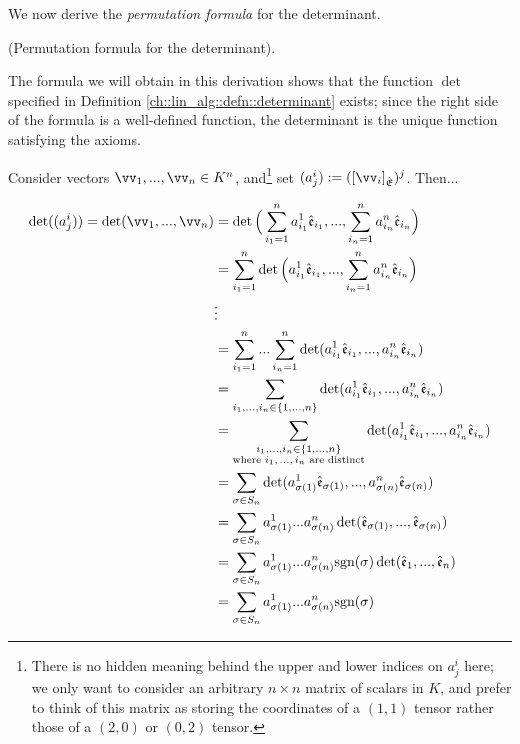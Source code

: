 We now derive the \textit{permutation formula} for the determinant.

\begin{deriv}
\label{ch::lin_alg::deriv::permutation_formula_for_determinant}
    (Permutation formula for the determinant).
    
    The formula we will obtain in this derivation shows that the function $\det$ specified in Definition \ref{ch::lin_alg::defn::determinant} exists; since the right side of the formula is a well-defined function, the determinant is the unique function satisfying the axioms.
    
    Consider vectors $\vv_1, ..., \vv_n \in K^n$, and\footnote{There is no hidden meaning behind the upper and lower indices on $a^i_j$ here; we only want to consider an arbitrary $n \times n$ matrix of scalars in $K$, and prefer to think of this matrix as storing the coordinates of a $(1, 1)$ tensor rather those of a $(2, 0)$ or $(0, 2)$ tensor.} set $(a^i_j) := ([\vv_i]_\sE)^j$. Then...
    
    \begin{align*}
        \det((a^i_j)) = \det(\vv_1, ..., \vv_n)
        &= \det \Big(\sum_{i_1 = 1}^n a^1_{i_1} \see_{i_1}, ..., \sum_{i_n = 1}^n a^n_{i_n} \see_{i_n} \Big) \\
        &= \sum_{i_1 = 1}^n \det \Big( a^1_{i_1} \see_{i_1}, ..., \sum_{i_n = 1}^n a^n_{i_n} \see_{i_n} \Big) \\
        &\vdots \\
        &= \sum_{i_1 = 1}^n ... \sum_{i_n = 1}^n \det(a^1_{i_1} \see_{i_1}, ..., a^n_{i_n} \see_{i_n}) \\
        &= \sum_{i_1, ..., i_n \in \{1, ..., n\}} \det(a^1_{i_1} \see_{i_1}, ..., a^n_{i_n} \see_{i_n}) \\
        &= \sum_{\substack{i_1, ..., i_n \in \{1, ..., n\} \\ \text{where $i_1, ..., i_n$ are distinct}}} \det(a^1_{i_1} \see_{i_1}, ..., a^n_{i_n} \see_{i_n}) \\
        &= \sum_{\sigma \in S_n}
        \det(a^1_{\sigma(1)} \see_{\sigma(1)}, ..., a^n_{\sigma(n)} \see_{\sigma(n)}) \\
        &= \sum_{\sigma \in S_n}
        a^1_{\sigma(1)} ... a^n_{\sigma(n)} \det(\see_{\sigma(1)}, ..., \see_{\sigma(n)}) \\
        &= \sum_{\sigma \in S_n} a^1_{\sigma(1)} ... a^n_{\sigma(n)} \text{sgn}(\sigma)
        \det(\see_1, ..., \see_n) \\
        &= \sum_{\sigma \in S_n} a^1_{\sigma(1)} ... a^n_{\sigma(n)} \text{sgn}(\sigma)
    \end{align*}
    

\end{deriv}
